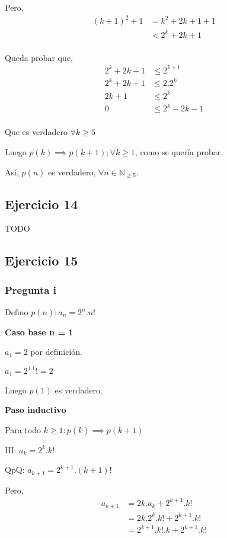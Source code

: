 Pero,
\begin{align*}
    (k+1)^2 +1 &= k^2 + 2k + 1 + 1 \\
    &< 2^k + 2k + 1 \\
\end{align*}

Queda probar que,
\begin{align*}
    2^k + 2k + 1 &\leq 2^{k+1} \\
    2^k + 2k + 1 &\leq 2.2^k \\
    2k + 1 &\leq 2^k\\
    0 &\leq 2^k  - 2k - 1\\
\end{align*}

Que es verdadero $\forall k \geq 5$

Luego $p(k) \implies p(k+1); \forall k \geq 1$, como se quería probar.

Así, $p(n)$ es verdadero, $\forall n \in \mathbb{N}_{\geq 5}$.

\subsection{Ejercicio 14}

TODO

\subsection{Ejercicio 15}

\subsubsection{Pregunta i}

Defino $ p(n): a_n = 2^n.n! $

\textbf{Caso base n = 1}

$ a_1 = 2 $ por definición. 

$ a_1 = 2^1.1! = 2 $

Luego $ p(1) $ es verdadero.

\textbf{Paso inductivo}

Para todo $k \geq 1: p(k) \implies p(k+1)$

HI: $ a_k = 2^k.k!$

QpQ: $ a_{k+1} = 2^{k+1}.(k+1)!$

Pero,
\begin{align*}
    a_{k+1} &= 2k . a_k + 2^{k+1}.k! \\
    &= 2k . 2^k.k! + 2^{k+1}.k! \\
    &= 2^{k+1}.k!.k + 2^{k+1}.k! \\
\end{align*}

